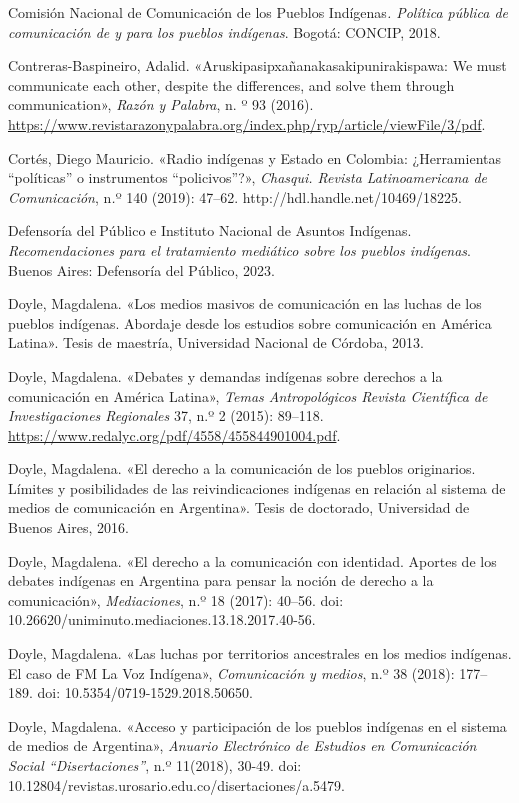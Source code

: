 \documentclass{tufte-handout}
\begin{document}
\begin{hangparas}{.25in}{1}
Comisión Nacional de Comunicación de los Pueblos Indígenas\emph{.
Política pública de comunicación de y para los pueblos indígenas}.
Bogotá: CONCIP, 2018.

Contreras-Baspineiro, Adalid. «Aruskipasipxañanakasakipunirakispawa: We
must communicate each other, despite the differences, and solve them
through communication», \emph{Razón y Palabra}, n. º 93 (2016).
\url{https://www.revistarazonypalabra.org/index.php/ryp/article/viewFile/3/pdf}.

Cortés, Diego Mauricio. «Radio indígenas y Estado en Colombia:
¿Herramientas ``políticas'' o instrumentos ``policivos''?»,
\emph{Chasqui. Revista Latinoamericana de Comunicación}, n\emph{.}º 140
(2019): 47--62. http://hdl.handle.net/10469/18225.

Defensoría del Público e Instituto Nacional de Asuntos Indígenas.
\emph{Recomendaciones para el tratamiento mediático sobre los pueblos
indígenas}. Buenos Aires: Defensoría del Público, 2023.

Doyle, Magdalena. «Los medios masivos de comunicación en las luchas de
los pueblos indígenas. Abordaje desde los estudios sobre comunicación en
América Latina». Tesis de maestría, Universidad Nacional de Córdoba,
2013.

Doyle, Magdalena. «Debates y demandas indígenas sobre derechos a la
comunicación en América Latina», \emph{Temas Antropológicos Revista
Científica de Investigaciones Regionales} 37, n.º 2 (2015): 89--118.
\url{https://www.redalyc.org/pdf/4558/455844901004.pdf}.

Doyle, Magdalena. «El derecho a la comunicación de los pueblos
originarios. Límites y posibilidades de las reivindicaciones indígenas
en relación al sistema de medios de comunicación en Argentina». Tesis de
doctorado, Universidad de Buenos Aires, 2016.

Doyle, Magdalena. «El derecho a la comunicación con identidad. Aportes
de los debates indígenas en Argentina para pensar la noción de derecho a
la comunicación», \emph{Mediaciones}, n.º 18 (2017): 40--56. doi:
10.26620/uniminuto.mediaciones.13.18.2017.40-56.

Doyle, Magdalena. «Las luchas por territorios ancestrales en los medios
indígenas. El caso de FM La Voz Indígena», \emph{Comunicación y medios},
n.º 38 (2018): 177--189. doi: 10.5354/0719-1529.2018.50650.

Doyle, Magdalena. «Acceso y participación de los pueblos indígenas en el
sistema de medios de Argentina», \emph{Anuario Electrónico de Estudios
en Comunicación Social ``Disertaciones''}, n.º 11(2018), 30-49. doi:
10.12804/revistas.urosario.edu.co/disertaciones/a.5479.


\end{hangparas}
\end{document}
